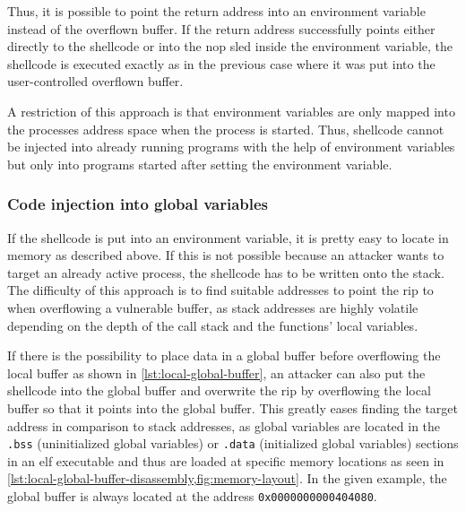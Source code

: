 Thus, it is possible to point the return address into an environment variable instead of the overflown buffer.
If the return address successfully points either directly to the shellcode or into the \acs{nop} sled inside the environment variable, the shellcode is executed exactly as in the previous case where it was put into the user-controlled overflown buffer.

A restriction of this approach is that environment variables are only mapped into the processes address space when the process is started.
Thus, shellcode cannot be injected into already running programs with the help of environment variables but only into programs started after setting the environment variable.

\subsubsection{Code injection into global variables}
\label{subsubsec:ci-via-globals}

If the shellcode is put into an environment variable, it is pretty easy to locate in memory as described above.
If this is not possible because an attacker wants to target an already active process, the shellcode has to be written onto the stack.
The difficulty of this approach is to find suitable addresses to point the \gls{rip} to when overflowing a vulnerable buffer, as stack addresses are highly volatile depending on the depth of the call stack and the functions' local variables.

If there is the possibility to place data in a global buffer before overflowing the local buffer as shown in \cref{lst:local-global-buffer}, an attacker can also put the shellcode into the global buffer and overwrite the \gls{rip} by overflowing the local buffer so that it points into the global buffer.
This greatly eases finding the target address in comparison to stack addresses, as global variables are located in the \texttt{.bss} (uninitialized global variables) or \texttt{.data} (initialized global variables) sections in an \gls{elf} executable and thus are loaded at specific memory locations as seen in \cref{lst:local-global-buffer-disassembly,fig:memory-layout}.
In the given example, the global buffer is always located at the address \texttt{0x0000000000404080}.



